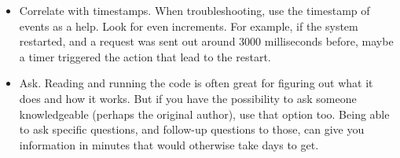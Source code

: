 \documentclass[runningheads]{llncs}
\begin{document}
\begin{itemize}
  \item Correlate with timestamps. When troubleshooting, use the timestamp of events as a help. Look for even increments. For example, if the system restarted, and a request was sent out around 3000 milliseconds before, maybe a timer triggered the action that lead to the restart.
  \item Ask. Reading and running the code is often great for figuring out what it does and how it works. But if you have the possibility to ask someone knowledgeable (perhaps the original author), use that option too. Being able to ask specific questions, and follow-up questions to those, can give you information in minutes that would otherwise take days to get.
\end{itemize}
\end{document}
